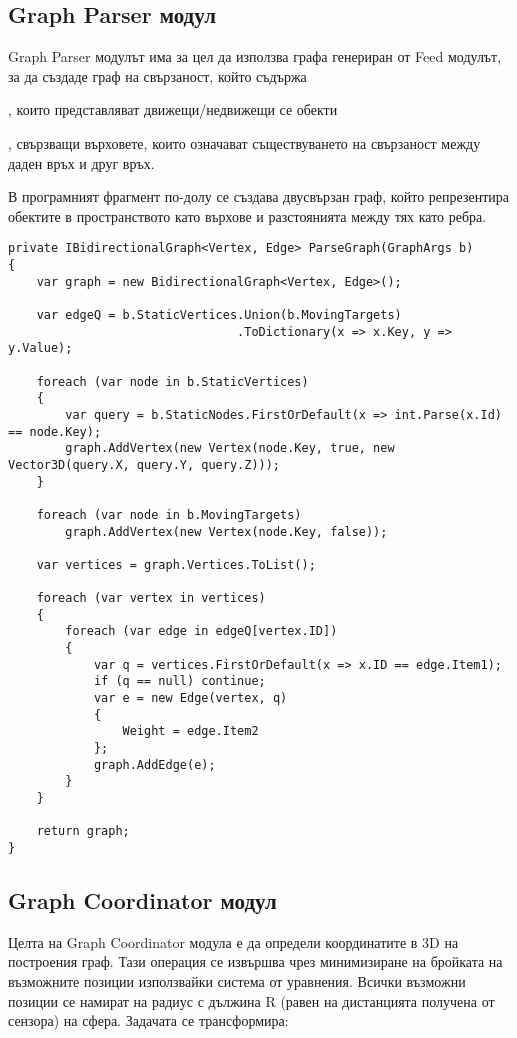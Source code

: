 \pagebreak

\subsection{Graph Parser модул}
Graph Parser модулът има за цел да използва графа генериран от Feed модулът, за да създаде граф на свързаност, който съдържа
\begin{enumerate}

, които представляват движещи/недвижещи се обекти 

, свързващи върховете, които означават съществуването на свързаност между
даден връх и друг връх.\\

\end{enumerate}

В програмният фрагмент по-долу се създава двусвързан граф, който репрезентира обектите в пространството като върхове и разстоянията между тях като ребра.
\begin{lstlisting}
private IBidirectionalGraph<Vertex, Edge> ParseGraph(GraphArgs b)
{
    var graph = new BidirectionalGraph<Vertex, Edge>();

    var edgeQ = b.StaticVertices.Union(b.MovingTargets)
                                .ToDictionary(x => x.Key, y => y.Value);

    foreach (var node in b.StaticVertices)
    {
        var query = b.StaticNodes.FirstOrDefault(x => int.Parse(x.Id) == node.Key);
        graph.AddVertex(new Vertex(node.Key, true, new Vector3D(query.X, query.Y, query.Z)));
    }

    foreach (var node in b.MovingTargets)
        graph.AddVertex(new Vertex(node.Key, false));

    var vertices = graph.Vertices.ToList();

    foreach (var vertex in vertices)
    {
        foreach (var edge in edgeQ[vertex.ID])
        {
            var q = vertices.FirstOrDefault(x => x.ID == edge.Item1);
            if (q == null) continue;
            var e = new Edge(vertex, q)
            {
                Weight = edge.Item2
            };
            graph.AddEdge(e);
        }
    }

    return graph;
}
\end{lstlisting}

\pagebreak

\subsection{Graph Coordinator модул}
Целта на Graph Coordinator модула е да определи координатите в 3D на построения граф. Тази операция се извършва чрез минимизиране на бройката на възможните позиции използвайки система от уравнения. Всички възможни позиции се намират на радиус с дължина R (равен на дистанцията получена от сензора) на сфера. Задачата се трансформира:\\

